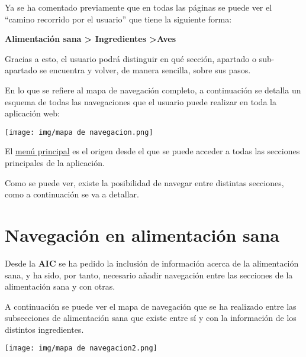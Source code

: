 \documentclass{\ClassPath/viu-tfm-template}
\begin{document}
Ya se ha comentado previamente que en todas las páginas se puede ver el “camino recorrido por el usuario” que tiene la siguiente forma:

\begin{center}
    \vspace{-10pt}
    \textbf{{\color{maincolor}Alimentación sana > \space Ingredientes} >\space Aves}
    \vspace{-15pt}
\end{center}

Gracias a esto, el usuario podrá distinguir en qué sección, apartado o sub-apartado se encuentra y volver, de manera sencilla, sobre sus pasos.

En lo que se refiere al mapa de navegación completo, a continuación se detalla un esquema de todas las navegaciones que el usuario puede realizar en toda la aplicación web:

\begin{center}
    \vspace{-10pt}
    \texttt{[image: img/mapa de navegacion.png]}
    \vspace{-20pt}
\end{center}

El \hyperlink{menu_principal}{menú principal} es el origen desde el que se puede acceder a todas las secciones principales de la aplicación.

Como se puede ver, existe la posibilidad de navegar entre distintas secciones, como a continuación se va a detallar.



\section{Navegación en alimentación sana}

Desde la \textbf{AIC} se ha pedido la inclusión de información acerca de la alimentación sana, y ha sido, por tanto, necesario añadir navegación entre las secciones de la alimentación sana y con otras.

A continuación se puede ver el mapa de navegación que se ha realizado entre las subsecciones de alimentación sana que existe entre sí y con la información de los distintos ingredientes.

\begin{center}
    \vspace{-10pt}
    \texttt{[image: img/mapa de navegacion2.png]}
    \vspace{-20pt}
\end{center}
\end{document}
